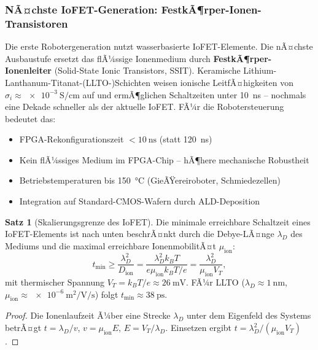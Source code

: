 ﻿\documentclass[a4paper,12pt]{scrreprt}
\theoremstyle{definition}
\newtheorem{satz}{Satz}[section]
\begin{document}
\subsubsection{NÃ¤chste IoFET-Generation: FestkÃ¶rper-Ionen-Transistoren}

Die erste Robotergeneration nutzt wasserbasierte IoFET-Elemente.
Die nÃ¤chste Ausbaustufe ersetzt das flÃ¼ssige Ionenmedium durch
\textbf{FestkÃ¶rper-Ionenleiter} (Solid-State Ionic Transistors, SSIT).
Keramische Lithium-Lanthanum-Titanat-(LLTO-)Schichten weisen
ionische LeitfÃ¤higkeiten von $\sigma_i \approx \SI{e-3}{\siemens\per\centi\meter}$
auf und ermÃ¶glichen Schaltzeiten unter \SI{10}{\nano\second} --
nochmals eine Dekade schneller als der aktuelle IoFET.
FÃ¼r die Robotersteuerung bedeutet das:
\begin{itemize}
  \item FPGA-Rekonfigurationszeit $< \SI{10}{\nano\second}$ (statt \SI{120}{\nano\second})
  \item Kein flÃ¼ssiges Medium im FPGA-Chip -- hÃ¶here mechanische Robustheit
  \item Betriebstemperaturen bis \SI{150}{\celsius} (GieÃŸereiroboter,
        Schmiedezellen)
  \item Integration auf Standard-CMOS-Wafern durch ALD-Deposition
\end{itemize}

\begin{satz}[Skalierungsgrenze des IoFET]
\label{satz:iofet_skalierung}
Die minimale erreichbare Schaltzeit eines IoFET-Elements ist
nach unten beschrÃ¤nkt durch die Debye-LÃ¤nge $\lambda_D$ des
Mediums und die maximal erreichbare IonenmobilitÃ¤t $\mu_{\text{ion}}$:
\begin{equation}
  t_{\min} \geq \frac{\lambda_D^2}{D_{\text{ion}}}
  = \frac{\lambda_D^2 k_B T}{e \mu_{\text{ion}} k_B T / e}
  = \frac{\lambda_D^2}{\mu_{\text{ion}} V_T},
\end{equation}
mit thermischer Spannung $V_T = k_BT/e \approx \SI{26}{\milli\volt}$.
FÃ¼r LLTO ($\lambda_D \approx \SI{1}{\nano\meter}$,
$\mu_{\text{ion}} \approx \SI{e-6}{\meter\squared\per\volt\per\second}$)
folgt $t_{\min} \approx \SI{38}{\pico\second}$.
\end{satz}

\begin{proof}
Die Ionenlaufzeit Ã¼ber eine Strecke $\lambda_D$ unter dem Eigenfeld des
Systems betrÃ¤gt $t = \lambda_D / v$, $v = \mu_{\text{ion}} E$,
$E = V_T / \lambda_D$. Einsetzen ergibt $t = \lambda_D^2/(\mu_{\text{ion}} V_T)$.
\end{proof}
\end{document}
